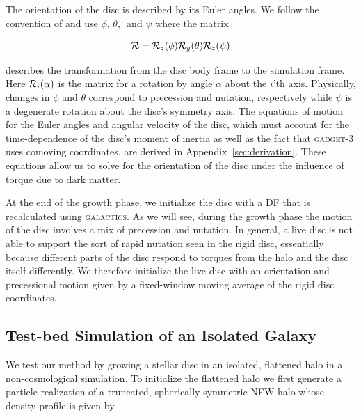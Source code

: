 The orientation of the disc is described by its Euler angles.  We
follow the convention of \citet{ThorntonAndMarion} and use
$\phi,\,\theta,\,$ and $\psi$ where the matrix

\begin{equation}
{\cal R} = {\cal R}_z(\phi) {\cal R}_y(\theta) {\cal R}_z(\psi)
\end{equation}

\noindent describes the transformation from the disc body frame to the
simulation frame.  Here ${\cal R}_i(\alpha)$ is the matrix for a
rotation by angle $\alpha$ about the $i$'th axis.  Physically, changes
in $\phi$ and $\theta$ correspond to precession and nutation,
respectively while $\psi$ is a degenerate rotation about the disc's
symmetry axis. The equations of motion for the Euler angles and
angular velocity of the disc, which must account for the
time-dependence of the disc's moment of inertia as well as the fact
that \textsc{gadget-3} uses comoving coordinates, are derived in
Appendix~\ref{sec:derivation}.  These equations allow us to solve for
the orientation of the disc under the influence of torque due to dark
matter.

At the end of the growth phase, we initialize the disc with a DF that
is recalculated using \textsc{galactics}.  As we will see, during the
growth phase the motion of the disc involves a mix of precession and
nutation.  In general, a live disc is not able to support the sort of
rapid nutation seen in the rigid disc, essentially because different
parts of the disc respond to torques from the halo and the disc itself
differently.  We therefore initialize the live disc with an
orientation and precessional motion given by a fixed-window moving average of the
rigid disc coordinates.

\subsection{Test-bed Simulation of an Isolated Galaxy}

We test our method by growing a stellar disc in an isolated, flattened
halo in a non-cosmological simulation.  To initialize the flattened halo we first generate a particle
realization of a truncated, spherically symmetric NFW halo \citep{NFW}
whose density profile is given by

